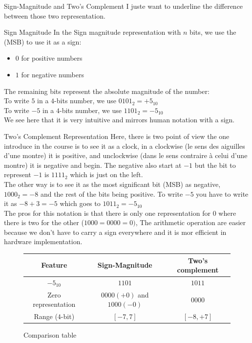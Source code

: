 \begin{parag}{Sign-Magnitude and Two's Complement}
    I juste want to underline the difference between those two representation. 
    \begin{subparag}{Sign Magnitude}
        In the Sign magnitude representation with $n$ bits, we use the  (MSB) to use it as a sign:
        \begin{itemize}
            \item $0$ for positive numbers
            \item $1$ for negative numbers
        \end{itemize}
        The remaining bits represent the absolute magnitude of the number:
        \\
        To write $5$ in a $4$-bits number, we use $0101_2 = +5_{10}$
        \\
        To write $-5$ in a $4$-bits number, we use $1101_2 = -5_{10}$
        \\
        We see here that it is very intuitive and mirrors human notation with a sign.
    \end{subparag}
    \begin{subparag}{Two's Complement Representation}
        Here, there is two point of view the one introduce in the course is to see it as a clock, in a clockwise (le sens des aiguilles d'une montre) it is positive, and unclockwise (dans le sens contraire à celui d'une montre) it is negative and begin. The negative also start at $-1$ but the bit to represent $-1$ is $1111_2$ which is just on the left.
        \\
        The other way is to see it as the most significant bit (MSB) as negative, $1000_2 = -8$ and the rest of the bits being positive. To write $-5$ you have to write it as $-8 + 3 = -5$ which goes to $1011_2 = -5_{10}$
        \\
        The pros for this notation is that there is only one representation for $0$ where there is two for the other ($1000 = 0000 = 0)$, The arithmetic operation are easier because we don't have to carry a sign everywhere and it is mor efficient in hardware implementation.
    \end{subparag}
\end{parag}    
\begin{figure}[h]
\centering
    \caption{Comparison table}
    \begin{tabular}{|c|c|c|}
    \hline
    Feature & Sign-Magnitude & Two's complement \\
    \hline
    \hline
     $-5_{10} $ & $1101$   &   $1011$ \\
     \hline
        Zero representation  & $0000 (+0)$ and $1000 (-0)$ & $0000$ \\
        \hline
        Range ($4$-bit) & $[-7, 7]$ & $[-8, +7]$ \\
        \hline
        
    \end{tabular}
    
    \label{fig:enter-label}
\end{figure}
    
    
